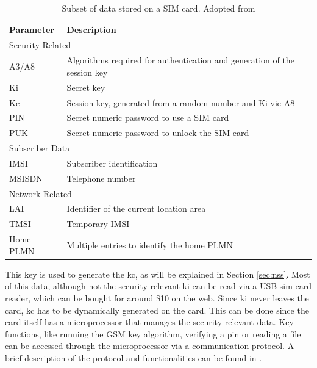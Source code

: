 \begin{table}
\centering
\begin{tabular}{@{}l>{\raggedright\arraybackslash}p{}@{}}
\toprule
Parameter		&Description\\
\midrule
\multicolumn{2}{l}{Security Related}\\
\midrule
A3/A8			&Algorithms required for authentication and generation of the session key\\
Ki				&Secret key\\
Kc				&Session key, generated from a random number and Ki vie A8\\
PIN				&Secret numeric password to use a SIM card\\
PUK				&Secret numeric password to unlock the SIM card\\
\midrule
\multicolumn{2}{l}{Subscriber Data}\\
\midrule
IMSI			&Subscriber identification\\
MSISDN			&Telephone number\\
\midrule
\multicolumn{2}{l}{Network Related}\\
\midrule
LAI				&Identifier of the current location area\\
TMSI			&Temporary IMSI\\
Home PLMN		&Multiple entries to identify the home PLMN\\
\bottomrule
\end{tabular}
\caption{Subset of data stored on a SIM card. Adopted from \cite{protocols1999}}
\label{tab:simdata}
\end{table}

This key is used to generate the \gls{kc}, as will be explained in Section \ref{sec:nss}.
Most of this data, although not the security relevant \gls{ki} can be read via a USB \gls{sim} card reader, which can be bought for around \$10 on the web.
Since \gls{ki} never leaves the card, \gls{kc} has to be dynamically generated on the card.
This can be done since the card itself has a microprocessor that manages the security relevant data.
Key functions, like running the GSM key algorithm, verifying a \gls{pin} or reading a file can be accessed through the microprocessor via a communication protocol.
A brief description of the protocol and functionalities can be found in \cite{kommsys2006}.

